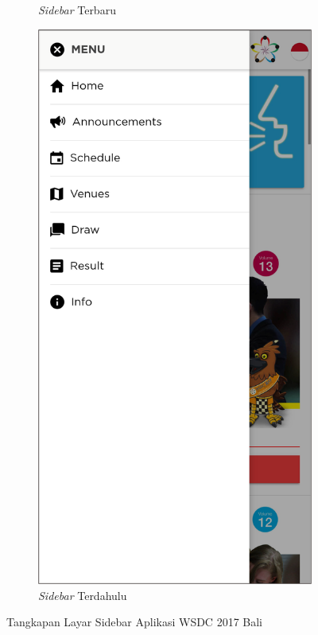 \begin{figure}[H]
\begin{subfigure}[b]{0.3\textwidth}
         \caption{\textit{Sidebar} Terbaru}
         \label{fig:ssSidebar}
     \end{subfigure}
     \hspace*{0.5in}
     \begin{subfigure}[b]{0.3\textwidth}
         \centering
         \includegraphics[width=\textwidth]{Gambar/SideBarOld.png}
         \caption{\textit{Sidebar} Terdahulu}
         \label{fig:ssSidebarOld}
     \end{subfigure}
        \caption{Tangkapan Layar Sidebar Aplikasi WSDC 2017 Bali}
        \label{fig:ssApk1}
\end{figure}


